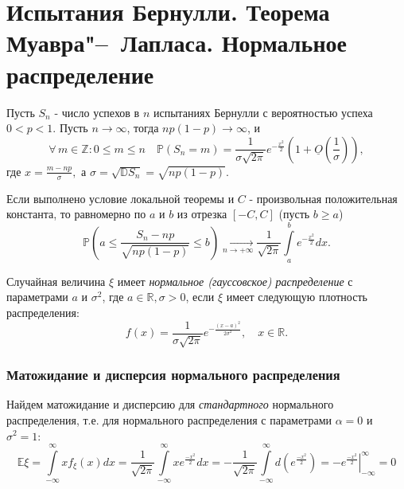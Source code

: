 \section{Испытания Бернулли. Теорема Муавра"--~Лапласа. Нормальное распределение}

\begin{namedthm} 
    Пусть $S_n$ - число успехов в $n$ испытаниях Бернулли с вероятностью успеха $0 < p < 1$. 
    Пусть $n \to \infty$, тогда $n p(1-p) {\longrightarrow} \infty$, и 
    $$ \forall \, m \in \mathbb{Z}: 0 \leqslant m \leqslant n \quad \mathbb{P}\left(S_{n}=m\right)=\frac{1}{\sigma \sqrt{2 \pi} } e^{-\frac{x^{2}}{2}}\left(1+\underline{O}\left(\frac{1}{\sigma}\right)\right), $$
    где $x = \frac{m - np}{\sigma},$ а $\sigma=\sqrt{\mathbb{D} S_{n}}=\sqrt{n p(1-p)}$.
\end{namedthm}  

\begin{namedthm}
Если выполнено условие локальной теоремы и $C$ - произвольная положительная константа, то равномерно по $a$ и $b$ из отрезка $[-C,C]$ (пусть $b \geqslant a$)
$$\mathbb{P}\left(a \leqslant \frac{S_{n}-n p}{\sqrt{n p(1-p)}} \leqslant b\right) \xrightarrow[n \to +\infty]{} \frac{1}{\sqrt{2 \pi}} \int\limits_{a}^{b} e^{-\frac{x^{2}}{2}} d x.$$
\end{namedthm} 

\begin{defn}
    Случайная величина $\xi$ имеет \textit{нормальное (гауссовское) распределение} с параметрами $a$ и $\sigma^2$, где $a \in \mathbb{R}, \sigma > 0$, если $\xi$ имеет следующую плотность распределения: 
$$f(x)=\frac{1}{\sigma \sqrt{2 \pi}} e^{-\frac{(x-a)^{2}}{2 \sigma^{2}}}, \quad x \in \mathbb{R}.$$
\end{defn}

\subsubsection{Матожидание и дисперсия нормального распределения}

Найдем матожидание и дисперсию для \textit{стандартного} нормального распределения, т.е. для нормального распределения с параметрами $\alpha = 0$ и $\sigma^2 = 1$:
\begin{equation*}
    \mathbb{E}\xi = 
    \int\limits_{-\infty}^{\infty} x f_{\xi}(x) dx =
    \frac{1}{\sqrt{2\pi}} \int\limits_{-\infty}^{\infty} x e^{\frac{-x^2}{2}} dx = 
    -\frac{1}{\sqrt{2\pi}} \int\limits_{-\infty}^{\infty} d\left( e^{\frac{-x^2}{2}}\right) = 
    \left. -e^{\frac{-x^2}{2}}\right|_{-\infty}^{\infty} = 0
\end{equation*}


